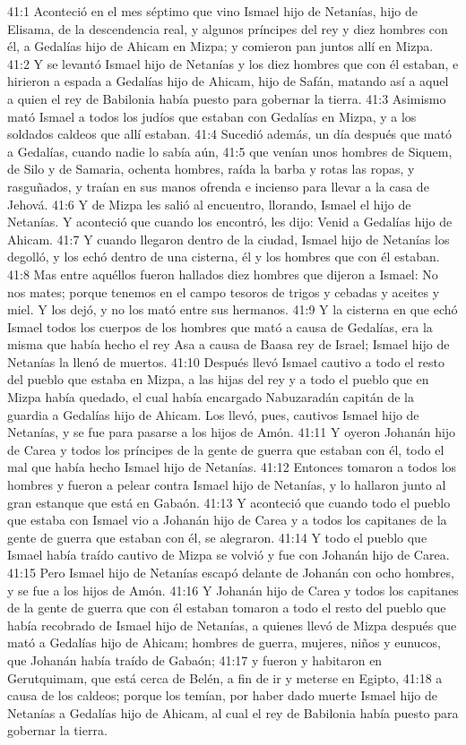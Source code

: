 41:1 Aconteció en el mes séptimo que vino Ismael hijo de Netanías, hijo de Elisama, de la descendencia real, y algunos príncipes del rey y diez hombres con él, a Gedalías hijo de Ahicam en Mizpa; y comieron pan juntos allí en Mizpa. 
41:2 Y se levantó Ismael hijo de Netanías y los diez hombres que con él estaban, e hirieron a espada a Gedalías hijo de Ahicam, hijo de Safán, matando así a aquel a quien el rey de Babilonia había puesto para gobernar la tierra. 
41:3 Asimismo mató Ismael a todos los judíos que estaban con Gedalías en Mizpa, y a los soldados caldeos que allí estaban. 
41:4 Sucedió además, un día después que mató a Gedalías, cuando nadie lo sabía aún, 
41:5 que venían unos hombres de Siquem, de Silo y de Samaria, ochenta hombres, raída la barba y rotas las ropas, y rasguñados, y traían en sus manos ofrenda e incienso para llevar a la casa de Jehová. 
41:6 Y de Mizpa les salió al encuentro, llorando, Ismael el hijo de Netanías. Y aconteció que cuando los encontró, les dijo: Venid a Gedalías hijo de Ahicam. 
41:7 Y cuando llegaron dentro de la ciudad, Ismael hijo de Netanías los degolló, y los echó dentro de una cisterna, él y los hombres que con él estaban. 
41:8 Mas entre aquéllos fueron hallados diez hombres que dijeron a Ismael: No nos mates; porque tenemos en el campo tesoros de trigos y cebadas y aceites y miel. Y los dejó, y no los mató entre sus hermanos. 
41:9 Y la cisterna en que echó Ismael todos los cuerpos de los hombres que mató a causa de Gedalías, era la misma que había hecho el rey Asa a causa de Baasa rey de Israel; Ismael hijo de Netanías la llenó de muertos. 
41:10 Después llevó Ismael cautivo a todo el resto del pueblo que estaba en Mizpa, a las hijas del rey y a todo el pueblo que en Mizpa había quedado, el cual había encargado Nabuzaradán capitán de la guardia a Gedalías hijo de Ahicam. Los llevó, pues, cautivos Ismael hijo de Netanías, y se fue para pasarse a los hijos de Amón. 
41:11 Y oyeron Johanán hijo de Carea y todos los príncipes de la gente de guerra que estaban con él, todo el mal que había hecho Ismael hijo de Netanías. 
41:12 Entonces tomaron a todos los hombres y fueron a pelear contra Ismael hijo de Netanías, y lo hallaron junto al gran estanque que está en Gabaón. 
41:13 Y aconteció que cuando todo el pueblo que estaba con Ismael vio a Johanán hijo de Carea y a todos los capitanes de la gente de guerra que estaban con él, se alegraron. 
41:14 Y todo el pueblo que Ismael había traído cautivo de Mizpa se volvió y fue con Johanán hijo de Carea. 
41:15 Pero Ismael hijo de Netanías escapó delante de Johanán con ocho hombres, y se fue a los hijos de Amón. 
41:16 Y Johanán hijo de Carea y todos los capitanes de la gente de guerra que con él estaban tomaron a todo el resto del pueblo que había recobrado de Ismael hijo de Netanías, a quienes llevó de Mizpa después que mató a Gedalías hijo de Ahicam; hombres de guerra, mujeres, niños y eunucos, que Johanán había traído de Gabaón; 
41:17 y fueron y habitaron en Gerutquimam, que está cerca de Belén, a fin de ir y meterse en Egipto, 
41:18 a causa de los caldeos; porque los temían, por haber dado muerte Ismael hijo de Netanías a Gedalías hijo de Ahicam, al cual el rey de Babilonia había puesto para gobernar la tierra. 
